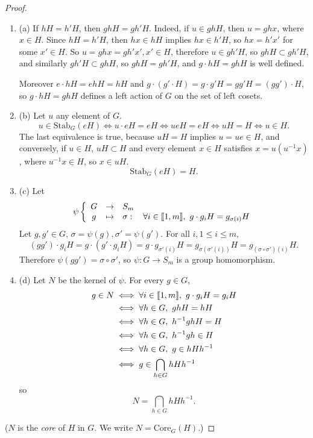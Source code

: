 \documentclass[11pt,a4paper]{article}
\def\gcro{\mbox{[\hspace{-.15em}[}}%
\def\dcro{\mbox{]\hspace{-.15em}]}}
\newcommand{\be} {\begin{enumerate}}
\newcommand{\ee} {\end{enumerate}}
\begin{document}
\begin{proof}
\be
\item[(a)] 
If $hH = h'H$, then $ghH = gh'H$. Indeed, if $u \in ghH$, then $u=ghx$, where $x \in H$. Since $hH = h'H$, then $hx \in hH$ implies $hx \in h'H$, so $hx = h'x'$ for some $x' \in H$. So $u = ghx = gh'x', x' \in H$, therefore $u \in gh'H$, so $ghH \subset gh'H$, and similarly $gh'H \subset ghH$, so $ghH = gh'H$, and $g\cdot hH = gh H$ is well defined.

Moreover $e\cdot hH = ehH = hH$ and $g\cdot (g' \cdot H) = g \cdot g'H = gg'H = (gg')\cdot H$, so $g\cdot hH = gh H$ defines a left action of $G$ on the set of left cosets.

\item[(b)] Let $u$ any element of $G$. 
$$u \in \mathrm{Stab}_G(eH) \iff u \cdot eH = eH \iff ueH =e H \iff uH = H \iff u \in H.$$
The last equivalence is true, because $uH = H$ implies $u = ue\in H$, and conversely, if $u \in H$, $uH \subset H$ and every element $x \in H$ satisfies 
$x = u(u^{-1}x)$, where $u^{-1} x \in H$, so $x \in uH$.
$$\mathrm{Stab}_G(eH) = H.$$

\item[(c)] 
Let 
$$
\psi 
\left\{
\begin{array}{ccl}
  G& \to  &  S_m \\
  g& \mapsto  &   \sigma : \quad \forall i \in \gcro 1,m\dcro, \ g \cdot g_i H = g_{\sigma(i)} H  
\end{array}
\right.
$$
Let $g, g' \in G$, $\sigma = \psi(g), \sigma' = \psi(g')$. For all $i, 1\leq i \leq m$,
$$(gg')\cdot g_iH = g\cdot (g'\cdot g_iH) = g\cdot g_{\sigma'(i)}H = g_{\sigma(\sigma'(i))}H =g_ {(\sigma \circ \sigma')(i)} H.$$ 
Therefore $\psi(gg') = \sigma \circ \sigma'$, so $\psi:G \to S_m$ is a group homomorphism.

\item[(d)] Let $N$ be the kernel of $\psi$. For every $g \in G$,
\begin{align*}
g \in N  &\iff \forall i \in \gcro 1, m \dcro,\ g \cdot g_i H = g_iH \\
&\iff \forall h \in G, \ gh H = h H \\
&\iff \forall h \in G, \ h^{-1}gh H =  H\\
&\iff  \forall h \in G, \ h^{-1}gh \in H\\
&\iff \forall h \in G,\ g \in hHh^{-1}\\
& \iff g \in \bigcap_{h\in G} hHh^{-1}
\end{align*}
so
$$N = \bigcap_{h\in G} hHh^{-1}.$$
\ee
($N$ is the {\it core} of $H$ in $G$. We write $N = \mathrm{Core}_G(H)$.)


\end{proof}
\end{document}
